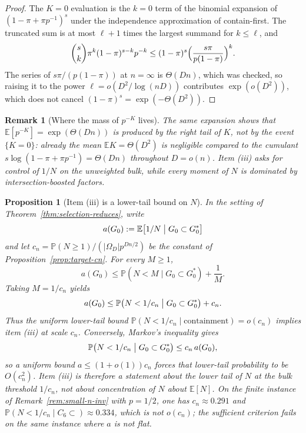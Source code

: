 \documentclass[11pt]{article}
\newtheorem{proposition}[theorem]{Proposition}
\newtheorem{remark}[theorem]{Remark}
\newcommand{\EE}{\mathbb{E}}
\newcommand{\PP}{\mathbb{P}}
\begin{document}
\begin{proof}
The \(K=0\) evaluation is the \(k=0\) term of the binomial expansion of
\((1-\pi+\pi p^{-1})^{s}\) under the independence approximation of
contain-first.
The truncated sum is at most \(\ell+1\) times the largest summand for
\(k\le\ell\), and
\[
\binom{s}{k}\pi^k(1-\pi)^{s-k}p^{-k}
\le
(1-\pi)^{s}\Bigl(\frac{s\pi}{p(1-\pi)}\Bigr)^{k}.
\]
The series of \(s\pi/(p(1-\pi))\) at \(n=\infty\) is \(\Theta(Dn)\), which was
checked, so raising it to the power \(\ell=o(D^2/\log(nD))\) contributes
\(\exp(o(D^2))\), which does not cancel \((1-\pi)^{s}=\exp(-\Theta(D^2))\).
\end{proof}

\begin{remark}[Where the mass of \(p^{-K}\) lives]
\label{rem:bias-tail}
The same expansion shows that \(\EE[p^{-K}]=\exp(\Theta(Dn))\) is produced by
the right tail of \(K\), not by the event \(\{K=0\}\): already the mean
\(\EE K=\Theta(D^2)\) is negligible compared to the cumulant
\(s\log(1-\pi+\pi p^{-1})=\Theta(Dn)\) throughout \(D=o(n)\).
Item (iii) asks for control of \(1/N\) on the unweighted bulk, while every
moment of \(N\) is dominated by intersection-boosted factors.
\end{remark}

\begin{proposition}[Item (iii) is a lower-tail bound on \(N\)]
\label{prop:iii-as-tail}
In the setting of Theorem~\ref{thm:selection-reduces}, write
\[
a(G_0)
:=
\EE\bigl[1/N\bigm|G_0\subset G^*_0\bigr]
\]
and let \(c_n=\PP(N\ge 1)/(\lvert\Omega_D\rvert p^{Dn/2})\) be the constant of
Proposition~\ref{prop:target-cn}.
For every \(M\ge 1\),
\[
a(G_0)
\le
\PP(N<M\mid G_0\subset G^*_0)
+
\frac{1}{M}.
\]
Taking \(M=1/c_n\) yields
\[
a(G_0)
\le
\PP\bigl(N<1/c_n\bigm|G_0\subset G^*_0\bigr)
+
c_n.
\]
Thus the uniform lower-tail bound
\(\PP(N<1/c_n\mid\text{containment})=o(c_n)\) implies item (iii) at scale
\(c_n\).
Conversely, Markov's inequality gives
\[
\PP\bigl(N<1/c_n\bigm|G_0\subset G^*_0\bigr)
\le
c_n\,a(G_0),
\]
so a uniform bound \(a\le(1+o(1))c_n\) forces that lower-tail probability to be
\(O(c_n^2)\).
Item (iii) is therefore a statement about the lower tail of \(N\) at the bulk
threshold \(1/c_n\), not about concentration of \(N\) about \(\EE[N]\).
On the finite instance of Remark~\ref{rem:small-n-inv} with \(p=1/2\), one has
\(c_n\approx 0.291\) and
\(\PP(N<1/c_n\mid C_6\subset)\approx 0.334\), which is not \(o(c_n)\); the
sufficient criterion fails on the same instance where \(a\) is not flat.
\end{proposition}
\end{document}
